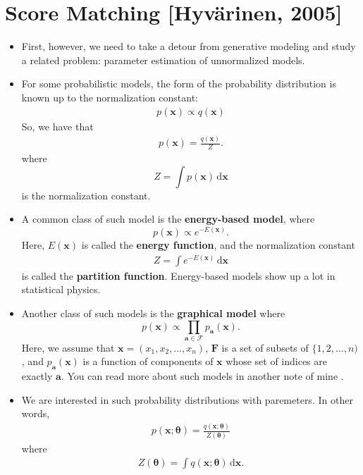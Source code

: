 \documentclass[10pt]{article}
\newcommand{\dee}{\mathrm{d}}
\newcommand{\ve}[1]{\mathbf{#1}}
\begin{document}
\section{Score Matching [Hyv\"{a}rinen, 2005]}

\begin{itemize}
  \item First, however, we need to take a detour from generative modeling and study a related problem: parameter estimation of unnormalized models.
  
  \item For some probabilistic models, the form of the probability distribution is known up to the normalization constant:
  \begin{align*}
      p(\ve{x}) \propto q(\ve{x})
  \end{align*}
  So, we have that
  \begin{align*}
      p(\ve{x}) = \frac{q(\ve{x})}{Z}.
  \end{align*}
  where $$Z = \int p(\ve{x})\, \dee\ve{x}$$ is the normalization constant.

  \item A common class of such model is the {\bf energy-based model}, where $$p(\ve{x}) \propto e^{-E(\ve{x})}.$$ Here, $E(\ve{x})$ is called the {\bf energy function}, and the normalization constant
  \begin{align*}
  Z = \int e^{-E(\ve{x})}\, \dee\ve{x}
  \end{align*}
  is called the {\bf partition function}. Energy-based models show up a lot in statistical physics.

  \item Another class of such models is the {\bf graphical model} where $$p(\ve{x}) \propto \prod_{\ve{a} \in \mathcal{F}} p_\ve{a}(\ve{x}).$$ Here, we assume that $\ve{x} = (x_1, x_2, \dotsc, x_n)$, $\ve{F}$ is a set of subsets of $\{1,2,\dotsc,n)$, and $p_\ve{a}(\ve{x})$ is a function of components of $\ve{x}$ whose set of indices are exactly $\ve{a}$. You can read more about such models in another note of mine \cite{KhungurnCrf}.
  
  \item We are interested in such probability distributions with paremeters. In other words,
  \begin{align*}
      p(\ve{x};\boldsymbol{\theta}) = \frac{q(\ve{x};\boldsymbol{\theta})}{Z(\boldsymbol{\theta})}
  \end{align*}
  where
  \begin{align*}
      Z(\boldsymbol{\theta}) = \int q(\ve{x};\boldsymbol{\theta})\, \dee\ve{x}.
  \end{align*}


\end{itemize}
\end{document}

